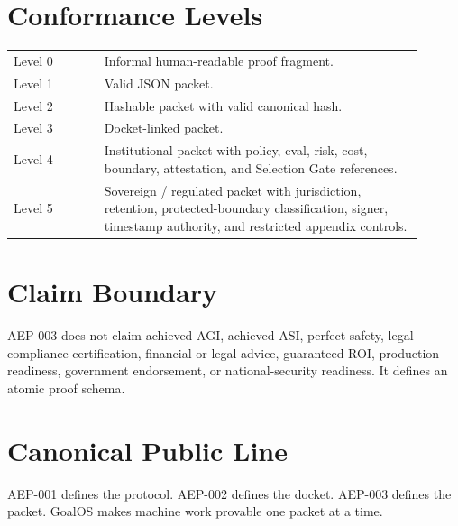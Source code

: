 \documentclass[11pt]{article}
\begin{document}
\section{Conformance Levels}
\begin{longtable}{p{0.20\linewidth}p{0.70\linewidth}}
Level 0 & Informal human-readable proof fragment.\\
Level 1 & Valid JSON packet.\\
Level 2 & Hashable packet with valid canonical hash.\\
Level 3 & Docket-linked packet.\\
Level 4 & Institutional packet with policy, eval, risk, cost, boundary, attestation, and Selection Gate references.\\
Level 5 & Sovereign / regulated packet with jurisdiction, retention, protected-boundary classification, signer, timestamp authority, and restricted appendix controls.\\
\end{longtable}

\section{Claim Boundary}
AEP-003 does not claim achieved AGI, achieved ASI, perfect safety, legal compliance certification, financial or legal advice, guaranteed ROI, production readiness, government endorsement, or national-security readiness. It defines an atomic proof schema.

\section*{Canonical Public Line}
AEP-001 defines the protocol. AEP-002 defines the docket. AEP-003 defines the packet. GoalOS makes machine work provable one packet at a time.
\end{document}
